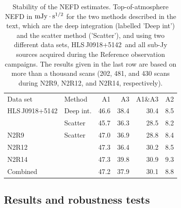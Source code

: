 \documentclass[traditionalabstract]{aa}
\newcommand{\hls}{HLS\,J0918+5142}
\begin{document}
{%
\begin{table}[!htbp]
  \centering
  \caption[]{Stability of the NEFD estimates. Top-of-atmosphere NEFD
    in $\rm{mJy} \cdot s^{1/2}$ for the two methods described in the text, which
  are the deep integration (labelled 'Deep int') and the scatter method
  ('Scatter'), and using two different data sets, \hls\
  and all sub-Jy sources acquired during the Reference observation
  campaigns. The results given in the last row are based on more than a thousand
  scans (202, 481, and 430 scans during N2R9, N2R12, and N2R14, respectively).}
  \label{tab:nefd_summary}
  \begin{tabular}{llrrrr}
    \hline\hline
    \noalign{\smallskip}
    Data set   & Method   & A1      &   A3    &   A1\&A3 &    A2 \\
    \noalign{\smallskip}
    \hline
    \noalign{\smallskip}
    \hls &     Deep int.  &  46.6  &    38.4  &    30.4  &   8.5  \\
         &     Scatter    &  45.7  &    36.3  &    28.5  &   8.2  \\
    \hline
    \noalign{\smallskip}
    N2R9     & Scatter    & 47.0 &  36.9  & 28.8  & 8.4 \\
    N2R12    &            & 47.3 &  36.4  & 30.2  & 8.5 \\
    N2R14    &            & 47.3 &  39.8  & 30.9  & 9.3 \\
    Combined &            & 47.2 &  37.9  & 30.1  & 8.8 \\
    \hline
  \end{tabular}
\end{table}

\subsection{Results and robustness tests}
\label{se:nefd_results}

}
\end{document}
